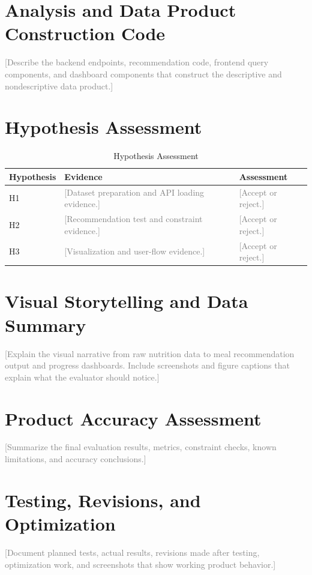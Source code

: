 \documentclass[12pt]{report}
\newcommand{\placeholder}[1]{\textcolor{gray}{[#1]}}
\begin{document}
\section{Analysis and Data Product Construction Code}
\placeholder{Describe the backend endpoints, recommendation code, frontend query components, and dashboard components that construct the descriptive and nondescriptive data product.}

\section{Hypothesis Assessment}
\begin{table}[H]
    \centering
    \caption{Hypothesis Assessment}
    \begin{tabular}{p{} p{} p{}}
        \toprule
        Hypothesis & Evidence & Assessment \\
        \midrule
        H1 & \placeholder{Dataset preparation and API loading evidence.} & \placeholder{Accept or reject.} \\
        H2 & \placeholder{Recommendation test and constraint evidence.} & \placeholder{Accept or reject.} \\
        H3 & \placeholder{Visualization and user-flow evidence.} & \placeholder{Accept or reject.} \\
        \bottomrule
    \end{tabular}
\end{table}

\section{Visual Storytelling and Data Summary}
\placeholder{Explain the visual narrative from raw nutrition data to meal recommendation output and progress dashboards. Include screenshots and figure captions that explain what the evaluator should notice.}

\section{Product Accuracy Assessment}
\placeholder{Summarize the final evaluation results, metrics, constraint checks, known limitations, and accuracy conclusions.}

\section{Testing, Revisions, and Optimization}
\placeholder{Document planned tests, actual results, revisions made after testing, optimization work, and screenshots that show working product behavior.}
\end{document}
